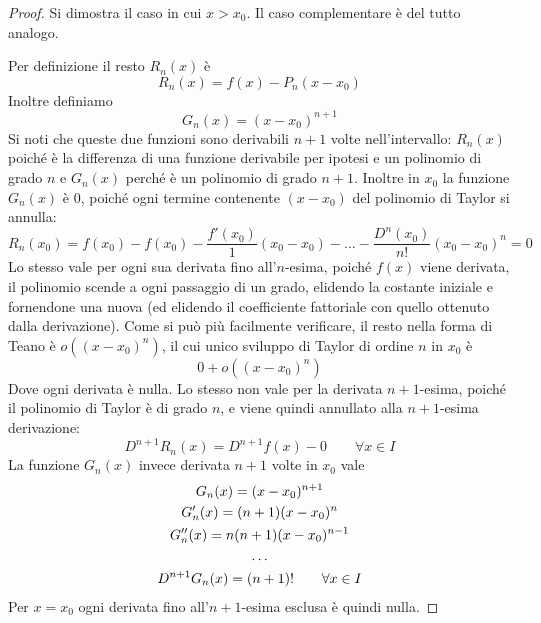 \begin{proof}
	Si dimostra il caso in cui $x>x_0$. Il caso complementare è del tutto analogo.

	Per definizione il resto $R_n(x)$ è
	\[
		R_n(x)=f(x)-P_n(x-x_0)
	\]
	Inoltre definiamo
	\[
		G_n(x)=(x-x_0)^{n+1}
	\]
	Si noti che queste due funzioni sono derivabili $n+1$ volte nell'intervallo: $R_n(x)$ poiché è la differenza di una funzione derivabile per ipotesi e un polinomio di grado $n$ e $G_n(x)$ perché è un polinomio di grado $n+1$. Inoltre in $x_0$ la funzione $G_n(x)$ è $0$, poiché ogni termine contenente $(x-x_0)$ del polinomio di Taylor si annulla:
	\[
		R_n(x_0)=f(x_0)-f(x_0)-\frac{f'(x_0)}{1}(x_0-x_0)-\dots-\frac{D^n(x_0)}{n!}(x_0-x_0)^n=0
	\]
	Lo stesso vale per ogni sua derivata fino all'$n$-esima, poiché $f(x)$ viene derivata, il polinomio scende a ogni passaggio di un grado, elidendo la costante iniziale e fornendone una nuova (ed elidendo il coefficiente fattoriale con quello ottenuto dalla derivazione). Come si può più facilmente verificare, il resto nella forma di Teano è $o((x-x_0)^n)$, il cui unico sviluppo di Taylor di ordine $n$ in $x_0$ è
	\[
		0+o((x-x_0)^n)
	\]
	Dove ogni derivata è nulla. Lo stesso non vale per la derivata $n+1$-esima, poiché il polinomio di Taylor è di grado $n$, e viene quindi annullato alla $n+1$-esima derivazione:
	\begin{equation}
		\label{relag:R}
		D^{n+1}R_n(x)=D^{n+1}f(x)-0\qquad\forall x\in I
	\end{equation}
	La funzione $G_n(x)$ invece derivata $n+1$ volte in $x_0$ vale
	\begin{gather}
		G_n(x)=(x-x_0)^{n+1}\notag\\
		G'_n(x)=(n+1)(x-x_0)^n\notag\\
		G''_n(x)=n(n+1)(x-x_0)^{n-1}\notag\\
		\dots\notag\\
		\label{relag:G}
		D^{n+1}G_n(x)=(n+1)!\qquad\forall x\in I
	\end{gather}
	Per $x=x_0$ ogni derivata fino all'$n+1$-esima esclusa è quindi nulla.


\end{proof}
